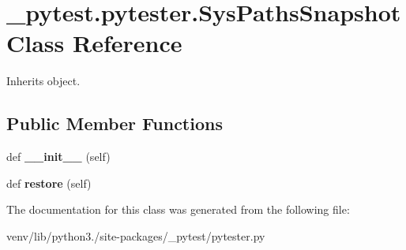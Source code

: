 \hypertarget{class__pytest_1_1pytester_1_1_sys_paths_snapshot}{}\section{\+\_\+pytest.\+pytester.\+Sys\+Paths\+Snapshot Class Reference}
\label{class__pytest_1_1pytester_1_1_sys_paths_snapshot}


Inherits object.

\subsection*{Public Member Functions}
\begin{DoxyCompactItemize}
\item 
\mbox{\label{class__pytest_1_1pytester_1_1_sys_paths_snapshot_a1515a0d4f038b1b46366ee697c86aa6f}} 
def {\bfseries \+\_\+\+\_\+init\+\_\+\+\_\+} (self)
\item 
\mbox{\label{class__pytest_1_1pytester_1_1_sys_paths_snapshot_acd4d407e13c2d26eee1cf912a27e8713}} 
def {\bfseries restore} (self)
\end{DoxyCompactItemize}


The documentation for this class was generated from the following file\+:\begin{DoxyCompactItemize}
\item 
venv/lib/python3./site-\/packages/\+\_\+pytest/pytester.\+py\end{DoxyCompactItemize}
